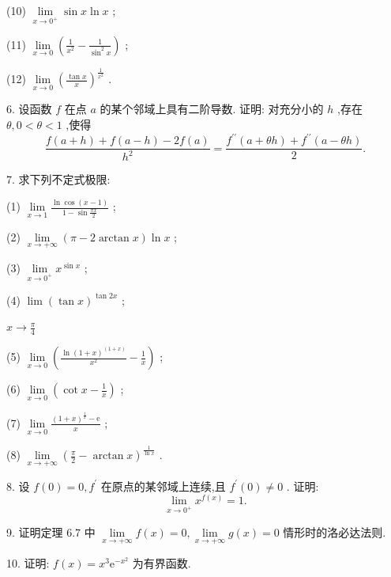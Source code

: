 (10) \(\mathop{\lim }\limits_{{x \rightarrow  {0}^{ + }}}\sin x\ln x\) ;

(11) \(\mathop{\lim }\limits_{{x \rightarrow  0}}\left( {\frac{1}{{x}^{2}} - \frac{1}{{\sin }^{2}x}}\right)\) ;

(12) \(\mathop{\lim }\limits_{{x \rightarrow  0}}{\left( \frac{\tan x}{x}\right) }^{\frac{1}{{x}^{2}}}\) .

6. 设函数 \(f\) 在点 \(a\) 的某个邻域上具有二阶导数. 证明: 对充分小的 \(h\) ,存在 \(\theta ,0 < \theta  < 1\) ,使得
\[
\frac{f\left( {a + h}\right)  + f\left( {a - h}\right)  - {2f}\left( a\right) }{{h}^{2}} = \frac{{f}^{\prime \prime }\left( {a + {\theta h}}\right)  + {f}^{\prime \prime }\left( {a - {\theta h}}\right) }{2}.
\]

7. 求下列不定式极限:

(1) \(\mathop{\lim }\limits_{{x \rightarrow  1}}\frac{\ln \cos \left( {x - 1}\right) }{1 - \sin \frac{\pi x}{2}}\) ;

(2) \(\mathop{\lim }\limits_{{x \rightarrow   + \infty }}\left( {\pi  - 2\arctan x}\right) \ln x\) ;

(3) \(\mathop{\lim }\limits_{{x \rightarrow  {0}^{ + }}}{x}^{\sin x}\) ;

(4) \(\lim {\left( \tan x\right) }^{\tan {2x}}\) ;

\(x \rightarrow  \frac{\pi }{4}\)

(5) \(\mathop{\lim }\limits_{{x \rightarrow  0}}\left( {\frac{\ln {\left( 1 + x\right) }^{\left( 1 + x\right) }}{{x}^{2}} - \frac{1}{x}}\right)\) ;

(6) \(\mathop{\lim }\limits_{{x \rightarrow  0}}\left( {\cot x - \frac{1}{x}}\right)\) ;

(7) \(\mathop{\lim }\limits_{{x \rightarrow  0}}\frac{{\left( 1 + x\right) }^{\frac{1}{x}} - \mathrm{e}}{x}\) ;

(8) \(\mathop{\lim }\limits_{{x \rightarrow   + \infty }}{\left( \frac{\pi }{2} - \arctan x\right) }^{\frac{1}{\ln x}}\) .

8. 设 \(f\left( 0\right)  = 0,{f}^{\prime }\) 在原点的某邻域上连续,且 \({f}^{\prime }\left( 0\right)  \neq  0\) . 证明:
\[
\mathop{\lim }\limits_{{x \rightarrow  {0}^{ + }}}{x}^{f\left( x\right) } = 1.
\]

9. 证明定理 6.7 中 \(\mathop{\lim }\limits_{{x \rightarrow   + \infty }}f\left( x\right)  = 0,\mathop{\lim }\limits_{{x \rightarrow   + \infty }}g\left( x\right)  = 0\) 情形时的洛必达法则.

10. 证明: \(f\left( x\right)  = {x}^{3}{\mathrm{e}}^{-{x}^{2}}\) 为有界函数.

